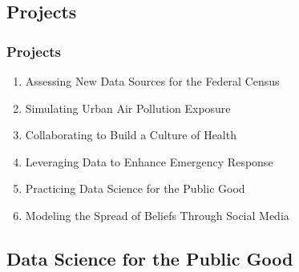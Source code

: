 \documentclass[compress]{beamer}
\begin{document}
\subsection[Projects]{Projects}

	\begin{frame}[Basic2] \frametitle{Projects}
		\begin{enumerate}
			\item Assessing New Data Sources for the Federal Census
			\item Simulating Urban Air Pollution Exposure
			\item Collaborating to Build a Culture of Health
			\item Leveraging Data to Enhance Emergency Response
			\item Practicing Data Science for the Public Good
			\item Modeling the Spread of Beliefs Through Social Media
		\end{enumerate}
		
	\end{frame}

\subsection[Data Science for the Public Good]{Data Science for the Public Good}
\end{document}
